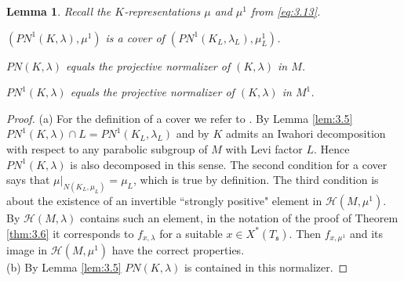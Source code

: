 \documentclass[11pt]{amsart}
\newtheorem{lem}[thm]{Lemma}
\theoremstyle{definition}
\begin{document}
\begin{lem}\label{lem:3.8}
Recall the $K$-representations $\mu$ and $\mu^1$ from \eqref{eq:3.13}.
{\begin{enumerate} {{
\item $(PN^1 (K,\lambda),\mu^1)$ is a cover of $(PN^1 (K_L ,\lambda_L),\mu^1_L)$. 
\item $PN (K,\lambda)$ equals the projective normalizer of $(K,\lambda)$ in $M$.
\item $PN^1 (K,\lambda)$ equals the projective normalizer of $(K,\lambda)$ in $M^1$.
}} \end{enumerate}}
\end{lem}
\begin{proof}
(a) For the definition of a cover we refer to \cite[8.1]{BuKu3}. By Lemma \ref{lem:3.5}
$PN^1 (K,\lambda) \cap L = PN^1 (K_L ,\lambda_L)$ and by \cite[Proposition 5.5]{Sec3} 
$K$ admits an Iwahori decomposition with respect to any parabolic subgroup of $M$ with 
Levi factor $L$. Hence $PN^1 (K,\lambda)$ is also decomposed in this sense. The second 
condition for a cover says that $\mu \big|_{N (K_L,\mu_L)} = \mu_L$, which is true by 
definition. The third condition is about the existence of an invertible ``strongly 
positive" element in ${{\mathcal H}} (M,\mu^1)$. By \cite[Proposition 5.5]{Sec3} ${{\mathcal H}} (M, \lambda)$ 
contains such an element, in the notation of the proof of Theorem \ref{thm:3.6} 
it corresponds to $f_{x,\lambda}$ for a suitable $x \in X^* (T_{{\mathfrak s}})$. 
Then $f_{x,\mu^1}$ and its image in ${{\mathcal H}} (M,\mu^1)$ have the correct properties. \\
(b) By Lemma \ref{lem:3.5} $PN (K,\lambda)$ is contained in this normalizer.


\end{proof}
\end{document}
